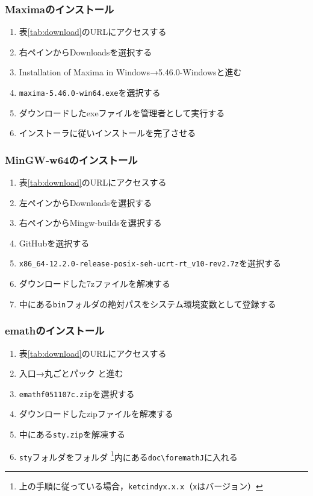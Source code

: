 \subsubsection{Maximaのインストール}
\begin{enumerate}
    \item 表\ref{tab:download}のURLにアクセスする
    \item 右ペインからDownloadsを選択する
    \item Installation of Maxima in Windows→5.46.0-Windowsと進む
    \item \verb|maxima-5.46.0-win64.exe|を選択する
    \item ダウンロードしたexeファイルを管理者として実行する
    \item インストーラに従いインストールを完了させる
\end{enumerate}

\subsubsection{MinGW-w64のインストール}
\begin{enumerate}
    \item 表\ref{tab:download}のURLにアクセスする
    \item 左ペインからDownloadsを選択する
    \item 右ペインからMingw-buildsを選択する
    \item GitHubを選択する
    \item \verb|x86_64-12.2.0-release-posix-seh-ucrt-rt_v10-rev2.7z|を選択する
    \item ダウンロードした7zファイルを解凍する
    \item 中にある\verb|bin|フォルダの絶対パスをシステム環境変数として登録する
\end{enumerate}

\subsubsection{emathのインストール}
\begin{enumerate}
    \item 表\ref{tab:download}のURLにアクセスする
    \item 入口→丸ごとパック と進む
    \item \verb|emathf051107c.zip|を選択する
    \item ダウンロードしたzipファイルを解凍する
    \item 中にある\verb|sty.zip|を解凍する
    \item \verb|sty|フォルダを{\ketcindy}フォルダ
          \cprotect\footnote{上の手順に従っている場合，\verb|ketcindyx.x.x|（\verb|x|はバージョン）}内にある\verb|doc\foremathJ|に入れる
\end{enumerate}


